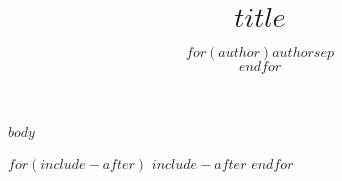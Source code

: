 \documentclass[ oneside,openright,titlepage,numbers=noenddot,headinclude,%
                BCOR=5mm,paper=a4,fontsize=11pt,%
                ngerman,american,%
                ]{scrreprt}
\title{\bigskip \bigskip $title$}
\author{$for(author)$$author$$sep$\\$endfor$}
\begin{document}
  
\maketitle

$body$

$for(include-after)$
$include-after$
$endfor$
\end{document}
